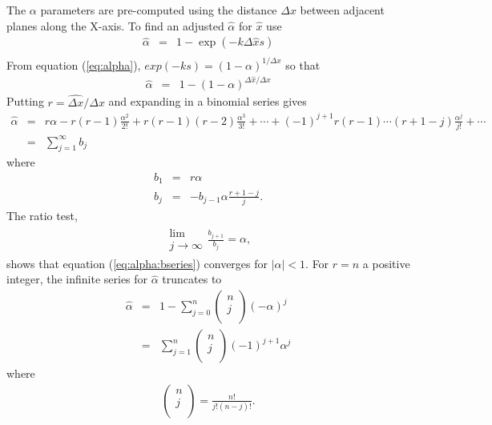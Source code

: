 The $\alpha$ parameters are pre-computed using the distance
$\Delta x$ between adjacent planes along the X-axis.  To find an
adjusted $\hat{\alpha}$ for $\hat{x}$ use
\begin{eqnarray*}
\hat{\alpha}&=&1-\exp(-k\Delta \hat{x}s)\\
\end{eqnarray*}
From equation (\ref{eq:alpha}), $exp(-ks)=(1-\alpha)^{1/\Delta x}$
so that
\begin{eqnarray*}
\hat{\alpha} &= &1 - \left(1-\alpha\right)^{\Delta \hat{x}/\Delta
x}
\end{eqnarray*}
Putting $r=\hat{\Delta x}/\Delta x$ and expanding in a binomial
series gives
\begin{eqnarray}
\hat{\alpha}&=&r\alpha-r(r-1)\frac{\alpha^2}{2!}+r(r-1)(r-2)\frac{\alpha^3}{3!}+\cdots+(-1)^{j+1}r(r-1)\cdots(r+1-j)\frac{\alpha^j}{j!}+\cdots\\
&=&\sum_{j=1}^\infty b_j \label{eq:alpha:bseries}
\end{eqnarray}
where
\begin{eqnarray*}
b_1&=&r\alpha\\
b_j&=&-b_{j-1}\alpha\frac{r+1-j}{j}.
\end{eqnarray*}
The ratio test,
\begin{eqnarray*}
\begin{array}{c}
\mbox{lim}\\
j\rightarrow\infty
\end{array}
\frac{b_{j+1}}{b_j}=\alpha,
\end{eqnarray*}
shows that equation (\ref{eq:alpha:bseries}) converges for
$|\alpha|<1$. For $r=n$ a positive integer, the infinite series
for $\hat{\alpha}$ truncates to
\begin{eqnarray}
\hat{\alpha}&=&1-\sum_{j=0}^n
\left(%
\begin{array}{c}
  n \\
  j \\
\end{array}%
\right)
(-\alpha)^j\\
&=&\sum_{j=1}^n
\left(%
\begin{array}{c}
  n \\
  j \\
\end{array}%
\right) (-1)^{j+1} \alpha^j \label{eq:alpha_finite}
\end{eqnarray}
where
\begin{eqnarray*}
\left(\begin{array}{c}
  n \\
  j \\
\end{array}\right)=\frac{n!}{j!(n-j)!}.
\end{eqnarray*}

